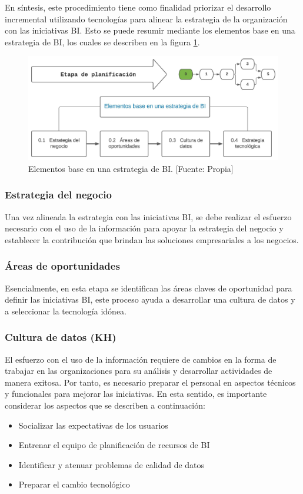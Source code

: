 \documentclass[11pt,titlepage]{report}
\begin{document}
En síntesis, este procedimiento tiene como finalidad priorizar el desarrollo incremental utilizando tecnologías para alinear la estrategia de la organización con las iniciativas BI. Esto se puede resumir mediante los elementos base en una estrategia de BI, los cuales se describen en la figura \ref{fig: ElementosBase}.

\begin{figure}[h]
\centering
\includegraphics[width=1\linewidth]{Figuras/etapa0}
\caption{Elementos base en una estrategia de BI. [Fuente: Propia]} \label{fig: ElementosBase}	
\end{figure} 

\subsubsection{Estrategia del negocio} 
Una vez alineada la estrategia con las iniciativas BI, se debe realizar el esfuerzo necesario con el uso de la información para apoyar la estrategia del negocio y establecer la contribución que brindan las soluciones empresariales a los negocios.

\subsubsection{Áreas de oportunidades} 
Esencialmente, en esta etapa se identifican las áreas claves de oportunidad para definir las iniciativas BI, este proceso ayuda a desarrollar una cultura de datos y a seleccionar la tecnología idónea.

\subsubsection{Cultura de datos (KH)} 

El esfuerzo con el uso de la información requiere de cambios en la forma de trabajar en las organizaciones para su análisis y desarrollar actividades de manera exitosa. Por tanto, es necesario preparar el personal en aspectos técnicos y funcionales para mejorar las iniciativas. En esta sentido, es importante considerar los aspectos que se describen a continuación:
\begin{multicols}{2}
\begin{itemize}
\item Socializar las expectativas de los usuarios
\item Entrenar el equipo de planificación de recursos de BI
\item Identificar y atenuar problemas de calidad de datos
\item Preparar el cambio tecnológico
\end{itemize}
\end{multicols}
	
\end{document}
